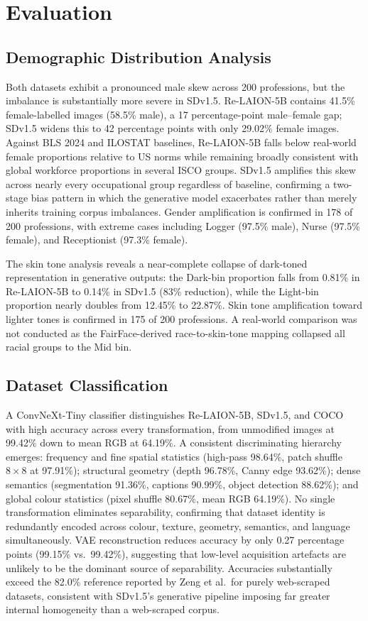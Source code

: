 \section{Evaluation}

\subsection{Demographic Distribution Analysis}

Both datasets exhibit a pronounced male skew across 200 professions, but the imbalance
is substantially more severe in SDv1.5. Re-LAION-5B contains 41.5\% female-labelled
images (58.5\% male), a 17 percentage-point male--female gap; SDv1.5 widens this
to 42 percentage points with only 29.02\% female images. Against BLS 2024 and ILOSTAT
baselines, Re-LAION-5B falls below real-world female proportions relative to US norms
while remaining broadly consistent with global workforce proportions in several ISCO
groups. SDv1.5 amplifies this skew across nearly every occupational group regardless of
baseline, confirming a two-stage bias pattern in which the generative model exacerbates
rather than merely inherits training corpus imbalances. Gender amplification is confirmed in 178 of 200 professions, with extreme cases including Logger (97.5\% male), Nurse (97.5\% female), and Receptionist (97.3\% female).

The skin tone analysis reveals a near-complete collapse of dark-toned representation in
generative outputs: the Dark-bin proportion falls from 0.81\% in Re-LAION-5B to 0.14\%
in SDv1.5 (83\% reduction), while the Light-bin proportion nearly doubles from 12.45\%
to 22.87\%. Skin tone amplification toward lighter tones is confirmed in 175 of 200
professions. A real-world comparison was not conducted as the FairFace-derived
race-to-skin-tone mapping collapsed all racial groups to the Mid bin.

\subsection{Dataset Classification}

A ConvNeXt-Tiny classifier distinguishes Re-LAION-5B, SDv1.5, and COCO with high
accuracy across every transformation, from unmodified images at 99.42\% down to mean RGB
at 64.19\%. A consistent discriminating hierarchy emerges: frequency and fine spatial
statistics (high-pass 98.64\%, patch shuffle $8{\times}8$ at 97.91\%); structural
geometry (depth 96.78\%, Canny edge 93.62\%); dense semantics (segmentation 91.36\%,
captions 90.99\%, object detection 88.62\%); and global colour statistics (pixel shuffle
80.67\%, mean RGB 64.19\%). No single transformation eliminates separability, confirming
that dataset identity is redundantly encoded across colour, texture, geometry, semantics,
and language simultaneously. VAE reconstruction reduces accuracy by only 0.27 percentage
points (99.15\% vs.\ 99.42\%), suggesting that low-level acquisition artefacts are
unlikely to be the dominant source of separability. Accuracies substantially exceed
the 82.0\% reference reported by Zeng et al.\ for purely web-scraped datasets,
consistent with SDv1.5's generative pipeline imposing far greater internal homogeneity than a web-scraped corpus.

